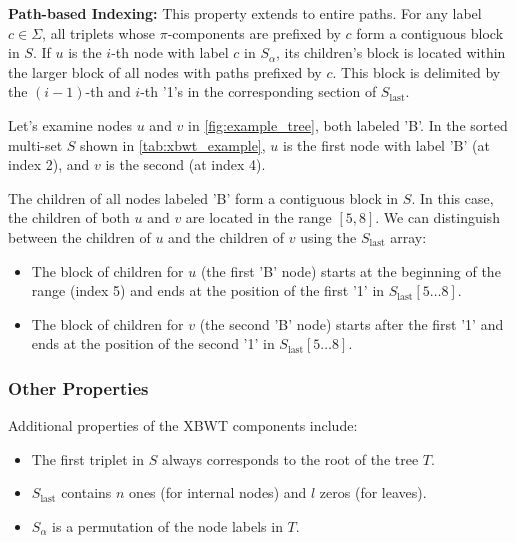 \textbf{Path-based Indexing:} This property extends to entire paths. For any label $c \in \Sigma$, all triplets whose $\pi$-components are prefixed by $c$ form a contiguous block in $S$. If $u$ is the $i$-th node with label $c$ in $S_{\alpha}$, its children's block is located within the larger block of all nodes with paths prefixed by $c$. This block is delimited by the $(i-1)$-th and $i$-th '1's in the corresponding section of $S_{\text{last}}$. \label{prop3}
\begin{example}
    Let's examine nodes $u$ and $v$ in \cref{fig:example_tree}, both labeled 'B'. In the sorted multi-set $S$ shown in \cref{tab:xbwt_example}, $u$ is the first node with label 'B' (at index 2), and $v$ is the second (at index 4).

    The children of all nodes labeled 'B' form a contiguous block in $S$. In this case, the children of both $u$ and $v$ are located in the range $[5, 8]$. We can distinguish between the children of $u$ and the children of $v$ using the $S_{\text{last}}$ array:
    \begin{itemize}
        \item The block of children for $u$ (the first 'B' node) starts at the beginning of the range (index 5) and ends at the position of the first '1' in $S_{\text{last}}[5\dots8]$.
        \item The block of children for $v$ (the second 'B' node) starts after the first '1' and ends at the position of the second '1' in $S_{\text{last}}[5\dots8]$.
    \end{itemize}
\end{example}

\subsubsection{Other Properties}
Additional properties of the XBWT components include:

\begin{itemize}
    \item The first triplet in $S$ always corresponds to the root of the tree $T$.
    \item $S_{\text{last}}$ contains $n$ ones (for internal nodes) and $l$ zeros (for leaves).
    \item $S_{\alpha}$ is a permutation of the node labels in $T$.
\end{itemize}


